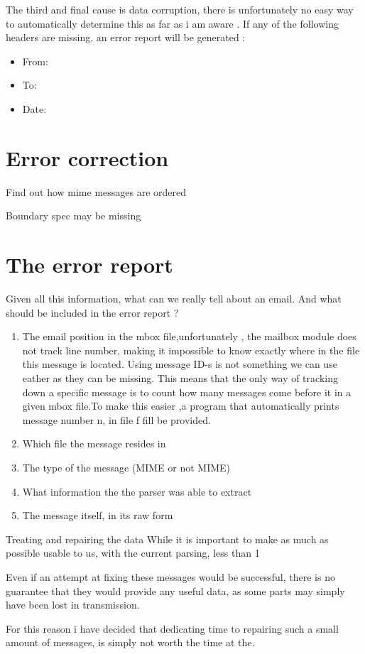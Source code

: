 \documentclass{report}
\begin{document}
The third and final cause is data corruption, there is unfortunately no easy way to automatically determine this as far as i am aware .
\noindent
If any of the following headers are missing, an error report will be generated :
\begin{itemize}
\item From:
\item To:
\item Date:
\end{itemize}

\section{Error correction}
Find out how mime messages are ordered 

Boundary spec may be missing 


\section{The error report}
Given all this information, what can we really tell about an email. And what should be included in the error report ?\\

\begin{enumerate}
\item The email position in the mbox file,unfortunately , the mailbox module does not track line number, making it impossible to know exactly where in the file this message is located. Using message ID-s is not something we can use eather as they can be missing. This means that the only way of tracking down a specific message is to count how many messages come before it in a given mbox file.To make this easier ,a program that automatically prints message number n, in file f fill be provided.
\item Which file the message resides in 
\item The type of the message (MIME or not MIME)
\item What information the the parser was able to extract 
\item The message itself, in its raw form

\end{enumerate}

Treating and repairing the data
While it is important to make as much as possible usable to us, with the current parsing, less than 1%

Even if an attempt at fixing these messages would be successful, there is no guarantee that they would provide any useful data, as some parts may simply have been lost in transmission.


For this reason i have decided that dedicating time to repairing such a small amount of messages, is simply not worth the time at the.







 
\end{document}
